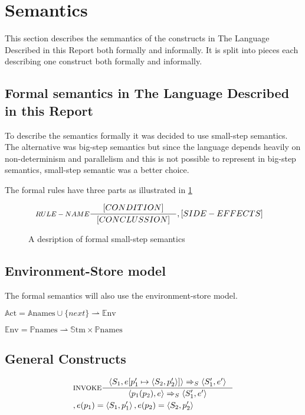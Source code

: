\section{Semantics}
This section describes the semmantics of the constructs in The Language Described in this Report both formally and informally. It is split into pieces each describing one construct both formally and informally.

\subsection{Formal semantics in The Language Described in this Report}
To describe the semantics formally it was decided to use small-step semantics. The alternative was big-step semantics but since the language depends heavily on non-determinism and parallelism and this is not possible to represent in big-step semantics, small-step semantic was a better choice.

The formal rules have three parts as illustrated in \cref{SS-semantics}

\begin{figure}[H]
\begin{align*}
&\inference[$RULE-NAME$]{[CONDITION]}
												{[CONCLUSSION]}
												{,[SIDE-EFFECTS]}
\end{align*}
\caption{A desription of formal small-step semantics}
\label{SS-semantics}
\end{figure}

\subsection{Environment-Store model}
The formal semantics will also use the environment-store model.


$\mathbb{A}\text{ct} = \mathbb{A}\text{names} \cup \{next\} \rightharpoonup \mathbb{E}\text{nv}$

$\mathbb{E}\text{nv} = \mathbb{P}\text{names} \rightharpoonup \mathbb{S}\text{tm} \times \mathbb{P}\text{names}$

\subsection{General Constructs}
\begin{align*}
&\inference[$\text{INVOKE}$]{\Braket{S_1,e[p_1' \mapsto \Braket{S_2,p_2'}]} \Rightarrow_S \Braket{S_1',e'}}
                  {\Braket{p_1(p_2),e} \Rightarrow_S \Braket{S_1',e'}}
\\
&									{,e(p_1) = \Braket{S_1,p_1'}, e(p_2) = \Braket{S_2,p_2'}}
\end{align*}

